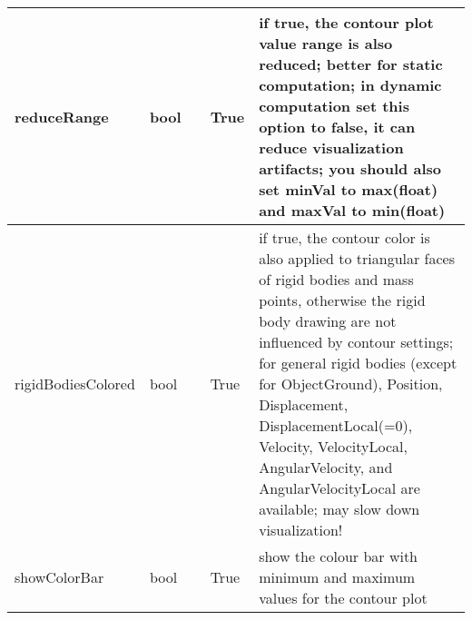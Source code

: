 \begin{center}
\begin{longtable}{| p{4.2cm} | p{2.5cm} | p{0.3cm} | p{3.0cm} | p{6cm} |}
    reduceRange &     bool &      &     True &     if true, the contour plot value range is also reduced; better for static computation; in dynamic computation set this option to false, it can reduce visualization artifacts; you should also set minVal to max(float) and maxVal to min(float)\\ \hline
    rigidBodiesColored &     bool &      &     True &     if true, the contour color is also applied to triangular faces of rigid bodies and mass points, otherwise the rigid body drawing are not influenced by contour settings; for general rigid bodies (except for ObjectGround), Position, Displacement, DisplacementLocal(=0), Velocity, VelocityLocal, AngularVelocity, and AngularVelocityLocal are available; may slow down visualization!\\ \hline
    showColorBar &     bool &      &     True &     show the colour bar with minimum and maximum values for the contour plot\\ \hline
	  \end{longtable}
	\end{center}

